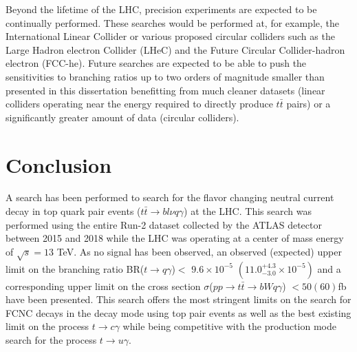 Beyond the lifetime of the LHC, precision experiments are expected to be continually performed.  These searches would be performed at, for example, the International Linear Collider \cite{Buesser:2013pza} or various proposed circular colliders such as the Large Hadron electron Collider (LHeC) and the Future Circular Collider-hadron electron (FCC-he)\cite{Benedikt:2015kqj}.  Future searches are expected to be able to push the sensitivities to branching ratios up to two orders of magnitude smaller than presented in this dissertation\cite{Cakir:2018ruj} benefitting from much cleaner datasets (linear colliders operating near the energy required to directly produce $t\bar{t}$ pairs) or a significantly greater amount of data (circular colliders).

\section{Conclusion}

A search has been performed to search for the flavor changing neutral current decay in top quark pair events ($t\bar{t}\rightarrow bl\nu q \gamma$) at the LHC.  This search was performed using the entire Run-2 dataset collected by the ATLAS detector between 2015 and 2018 while the LHC was operating at a center of mass energy of $\sqrt{s}=13$ TeV.  As no signal has been observed, an observed (expected) upper limit on the branching ratio BR($t\rightarrow q \gamma$)$<$ $9.6\times10^{-5}$ $(11.0^{+4 .3}_{-3.0}\times10^{-5})$ and a corresponding upper limit on the cross section $\sigma$($pp\rightarrow t\bar{t} \rightarrow bWq\gamma$) $< 50 (60)$fb have been presented.  This search offers the most stringent limits on the search for FCNC decays in the decay mode using top pair events as well as the best existing limit on the process $t\rightarrow c \gamma$ while being competitive with the production mode search for the process $t\rightarrow u \gamma$.

%
